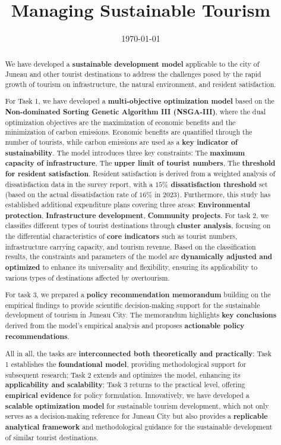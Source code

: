 \documentclass{mcmthesis}
\title{Managing Sustainable Tourism}
\date{\today}
\begin{document}
\begin{abstract}

  We have developed a \textbf{sustainable development model} applicable to the city of Juneau and 
other tourist destinations to address the challenges posed by the rapid growth of tourism
on infrastructure, the natural environment, and resident satisfaction.\par  
For Task 1, we have developed a \textbf{multi-objective optimization model} based on the 
\textbf{Non-dominated Sorting Genetic Algorithm III (NSGA-III)}, where the dual optimization 
objectives are the maximization of economic benefits and the minimization of carbon emissions. 
Economic benefits are quantified through the number of tourists, while carbon emissions 
are used as a \textbf{key indicator of sustainability}. The model introduces three key constraints:  
The \textbf{maximum capacity of infrastructure},
The \textbf{upper limit of tourist numbers},
The \textbf{threshold for resident satisfaction}.
Resident satisfaction is derived from a weighted analysis of dissatisfaction data in the 
survey report, with a \textbf{$15\%$ dissatisfaction threshold} set (based on the actual 
dissatisfaction rate of $16\%$ in 2023). Furthermore, this study has established additional 
expenditure plans covering three areas:
\textbf{Environmental protection},
\textbf{Infrastructure development}, 
\textbf{Community projects}. 
For task 2, we classifies different types of tourist destinations through \textbf{cluster analysis}, 
focusing on the differential characteristics of \textbf{core indicators} such as tourist numbers, 
infrastructure carrying capacity, and tourism revenue. Based on the classification results, 
the constraints and parameters of the model are \textbf{dynamically adjusted and optimized} to enhance its 
universality and flexibility, ensuring its applicability to various types of destinations affected 
by overtourism.\par

For task 3, we prepared a \textbf{policy recommendation memorandum} building on the empirical findings to 
provide scientific decision-making support for the sustainable development of tourism in Juneau 
City. The memorandum highlights \textbf{key conclusions} derived from the model's empirical analysis and 
proposes \textbf{actionable policy recommendations}.\par

All in all, the tasks are \textbf{interconnected both theoretically and practically}: Task 1 establishes the \textbf{foundational 
model}, providing methodological support for subsequent research; Task 2 extends and optimizes the 
model, enhancing its \textbf{applicability and scalability}; Task 3 returns to the practical level, offering 
\textbf{empirical evidence} for policy formulation. Innovatively, we have developed a \textbf{scalable optimization 
model} for sustainable tourism development, which not only serves as a decision-making reference for 
Juneau City but also provides a \textbf{replicable analytical framework} and methodological guidance for the 
sustainable development of similar tourist destinations.


\end{abstract}
\end{document}

